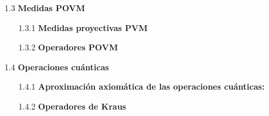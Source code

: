 \documentclass[12pt,oneside]{book}\raggedbottom{} %
\begin{document}
\begin{sloppypar}
{{\begin{itemize}
\begin{itemize}
  \item[1.2.2] \textbf{El operador de densidad reducido:} 
  

\end{itemize}
\item[1.3] \textbf{Medidas POVM} 
\begin{itemize}
  \item[1.3.1]\textbf{Medidas proyectivas PVM}
  
  
  
  \item[1.3.2]\textbf{Operadores POVM} 
  
\end{itemize}
\item[1.4]\textbf{Operaciones cuánticas}
\begin{itemize}
  \item[1.4.1] \textbf{Aproximación axiomática de las operaciones cuánticas:} %
  \item[1.4.2] \textbf{Operadores de Kraus }
  
  

\end{itemize}
\end{itemize}}}
\end{sloppypar}
\end{document}
